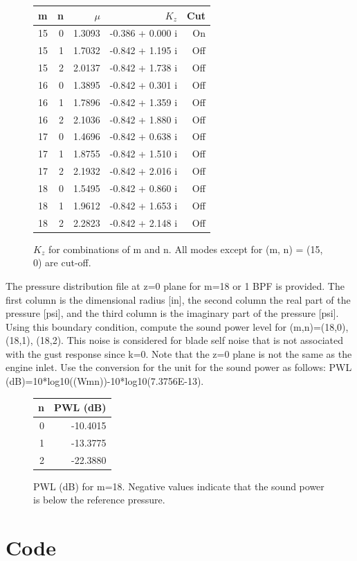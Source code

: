 \documentclass[onecolumn,10pt]{jhwhw}
\begin{document}
\begin{figure}[h]
\centering
\begin{tabular}{lr|rr|r}
\toprule
 m &  n &   $\mu$ &             $K_z$ &    Cut \\
\midrule
15 &  0 &  1.3093 & -0.386 +  0.000 i &    On  \\
15 &  1 &  1.7032 & -0.842 +  1.195 i &    Off \\
15 &  2 &  2.0137 & -0.842 +  1.738 i &    Off \\
\midrule
16 &  0 &  1.3895 & -0.842 +  0.301 i &    Off \\
16 &  1 &  1.7896 & -0.842 +  1.359 i &    Off \\
16 &  2 &  2.1036 & -0.842 +  1.880 i &    Off \\
\midrule
17 &  0 &  1.4696 & -0.842 +  0.638 i &    Off \\
17 &  1 &  1.8755 & -0.842 +  1.510 i &    Off \\
17 &  2 &  2.1932 & -0.842 +  2.016 i &    Off \\
\midrule
18 &  0 &  1.5495 & -0.842 +  0.860 i &    Off \\
18 &  1 &  1.9612 & -0.842 +  1.653 i &    Off \\
18 &  2 &  2.2823 & -0.842 +  2.148 i &    Off \\
\bottomrule
\end{tabular}
\caption{$K_z$ for combinations of m and n. All modes except for (m, n) = (15, 0) are cut-off.}
\end{figure}

\problem{[30 points]}
The pressure distribution file at z=0 plane for m=18 or 1 BPF is provided. The first column is the dimensional radius [in], the second column the real part of the pressure [psi], and the third column is the imaginary part of the pressure [psi]. Using this boundary condition, compute the sound power level for (m,n)=(18,0), (18,1), (18,2). This noise is considered for blade self noise that is not associated with the gust response since k=0. Note that the z=0 plane is not the same as the engine inlet. Use the conversion for the unit for the sound power as follows: PWL (dB)=10*log10((Wmn))-10*log10(7.3756E-13).

\begin{figure}[h]
\centering
\begin{tabular}{rr}
\toprule
n &         PWL (dB) \\
\midrule
  0 &  -10.4015 \\
  1 &  -13.3775 \\
  2 &  -22.3880 \\
\bottomrule
\end{tabular}
\caption{PWL (dB) for m=18. Negative values indicate that the sound power is below the reference pressure.}
\end{figure}

\clearpage
\section{Code}

\end{document}
